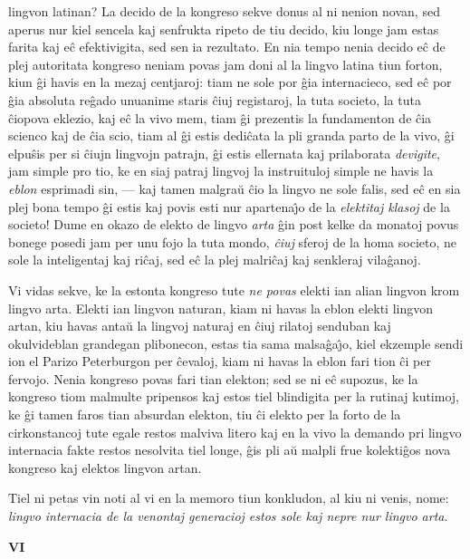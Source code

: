 lingvon latinan? La decido de la kongreso sekve donus al ni nenion
novan, sed aperus nur kiel sencela kaj senfrukta ripeto de tiu
decido, kiu longe jam estas farita kaj e\^c efektivigita, sed sen ia
rezultato. En nia tempo nenia decido e\^c de plej autoritata
kongreso neniam povas jam doni al la lingvo latina tiun forton, kiun
\^gi havis en la mezaj centjaroj: tiam ne sole por \^gia
internacieco, sed e\^c por \^gia absoluta re\^gado unuanime staris
\^ciuj registaroj, la tuta societo, la tuta \^ciopova eklezio, kaj
e\^c la vivo mem, tiam \^gi prezentis la fundamenton de \^cia
scienco kaj de \^cia scio, tiam al \^gi estis dedi\^cata la pli
granda parto de la vivo, \^gi elpu\^sis per si \^ciujn lingvojn
patrajn, \^gi estis ellernata kaj prilaborata {\sl devigite}, jam
simple pro tio, ke en siaj patraj lingvoj la instruituloj simple ne
havis la {\sl eblon} esprimadi sin,
--- kaj tamen malgra\u u \^cio la lingvo ne sole falis, sed e\^c en
sia plej bona tempo \^gi estis kaj povis esti nur apartena\^{\j}o de
la {\sl elektitaj klasoj} de la societo! Dume en okazo de elekto de
lingvo {\sl arta} \^gin post kelke da monatoj povus bonege posedi
jam per unu fojo la tuta mondo, {\sl \^ciuj} sferoj de la homa
societo, ne sole la inteligentaj kaj ri\^caj, sed e\^c la plej
malri\^caj kaj senkleraj vila\^ganoj.

   Vi vidas sekve, ke la estonta kongreso tute {\sl ne povas} elekti ian
alian lingvon krom lingvo arta. Elekti ian lingvon naturan, kiam ni
havas la eblon elekti lingvon artan, kiu havas anta\u u la lingvoj
naturaj en \^ciuj rilatoj senduban kaj okulvideblan grandegan
plibonecon, estas tia sama malsa\^ga\^{\j}o, kiel ekzemple sendi ion
el Parizo Peterburgon per \^cevaloj, kiam ni havas la eblon fari
tion \^ci per fervojo. Nenia kongreso povas fari tian elekton; sed
se ni e\^c supozus, ke la kongreso tiom malmulte pripensos kaj estos
tiel blindigita per la rutinaj kutimoj, ke \^gi tamen faros tian
absurdan elekton, tiu \^ci elekto per la forto de la cirkonstancoj
tute egale restos malviva litero kaj en la vivo la demando pri
lingvo internacia fakte restos nesolvita tiel longe, \^gis pli a\u u
malpli frue kolekti\^gos nova kongreso kaj elektos lingvon artan.

   Tiel ni petas vin noti al vi en la memoro tiun konkludon, al kiu ni
venis, nome: {\sl lingvo internacia de la venontaj generacioj estos
sole kaj nepre nur lingvo arta}.

\begin{center}
\textbf{VI}
\end{center}

